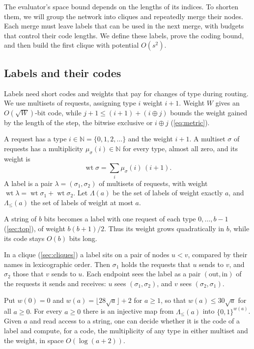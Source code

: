 \documentclass[11pt]{article}
\theoremstyle{definition}
\theoremstyle{definition}
\theoremstyle{remark}
\newcommand{\N}{\mathbb{N}}
\newcommand{\wt}{\operatorname{wt}}
\newcommand{\out}{\mathrm{out}}
\newcommand{\inn}{\mathrm{in}}
\begin{document}
The evaluator's space bound depends on the lengths of its indices. To shorten them, we will group the network into cliques and repeatedly merge their nodes. Each merge must leave labels that can be used in the next merge, with budgets that control their code lengths. We define these labels, prove the coding bound, and then build the first clique with potential $O(s^2)$.

\subsection{Labels and their codes}

Labels need short codes and weights that pay for changes of type during routing. We use multisets of requests, assigning type $i$ weight $i+1$. Weight $W$ gives an $O(\sqrt W)$-bit code, while $j+1\le(i+1)+(i\oplus j)$ bounds the weight gained by the length of the step, the bitwise exclusive or $i\oplus j$ (\cref{eq:metric}).

A request has a type $i\in\N=\{0,1,2,\dots\}$ and the weight $i+1$. A multiset $\sigma$ of requests has a multiplicity $\mu_\sigma(i)\in\N$ for every type, almost all zero, and its weight is
\[
\wt\sigma=\sum_i\mu_\sigma(i)\,(i+1).
\]
A label is a pair $\lambda=(\sigma_1,\sigma_2)$ of multisets of requests, with weight $\wt\lambda=\wt\sigma_1+\wt\sigma_2$. Let $\Lambda(a)$ be the set of labels of weight exactly $a$, and $\Lambda_{\le}(a)$ the set of labels of weight at most $a$.

A string of $b$ bits becomes a label with one request of each type $0,\dots,b-1$ (\cref{sec:top}), of weight $b(b+1)/2$. Thus its weight grows quadratically in $b$, while its code stays $O(b)$ bits long.

In a clique (\cref{sec:cliques}) a label sits on a pair of nodes $u<v$, compared by their names in lexicographic order. Then $\sigma_1$ holds the requests that $u$ sends to $v$, and $\sigma_2$ those that $v$ sends to $u$. Each endpoint sees the label as a pair $(\out,\inn)$ of the requests it sends and receives: $u$ sees $(\sigma_1,\sigma_2)$, and $v$ sees $(\sigma_2,\sigma_1)$.

\begin{lemma}\label{lem:codes}
Put $w(0)=0$ and $w(a)=\lfloor28\sqrt a\rfloor+2$ for $a\ge1$, so that $w(a)\le30\sqrt a$ for all $a\ge0$. For every $a\ge0$ there is an injective map from $\Lambda_{\le}(a)$ into $\{0,1\}^{w(a)}$. Given $a$ and read access to a string, one can decide whether it is the code of a label and compute, for a code, the multiplicity of any type in either multiset and the weight, in space $O(\log(a+2))$.
\end{lemma}
\end{document}
